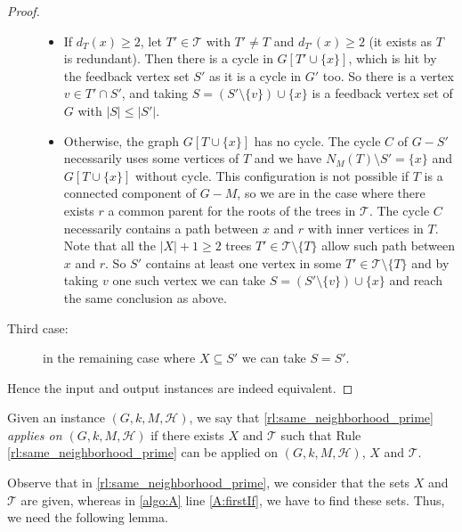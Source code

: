 \documentclass{amsart}
\newcommand{\T}{\mathcal{T}}
\newcommand{\mT}{\mathcal{T}}
\newcommand{\mH}{\mathcal{H}}
\newcommand{\ruleref}[1]{\hyperref[#1]{\ref*{#1}}}
\begin{document}
\begin{proof}
\begin{description}
\begin{itemize}
    \item If $d_{T}(x)\geq 2$, let $T'\in \T$ with $T'\neq T$ and $d_{T'}(x)\geq 2$ (it exists as $T$ is redundant). Then there is a cycle in $G[T'\cup \{x\}]$, which is hit by the feedback vertex set $S'$ as it is a cycle in $G'$ too. So there is a vertex $v\in T'\cap S'$, and taking $S=\left(S'\setminus \{v\}\right) \cup \{x\}$ is a feedback vertex set of $G$ with $|S|\leq |S'|$.

    \item Otherwise, the graph $G[T\cup \{ x \}]$ has no cycle. The cycle $C$ of $G-S'$ necessarily uses some vertices of $T$ and we have $N_M(T)\setminus S'=\{x\}$ and $G[T\cup \{ x \}]$ without cycle. This configuration is not possible if $T$ is a connected component of $G-M$, so we are in the case where there exists $r$ a common parent for the roots of the trees in $\T$. The cycle $C$ necessarily contains a path between $x$ and $r$ with inner vertices in $T$. Note that all the $|X|+1\ge 2$ trees $T'\in \T\setminus \{T\}$ allow such path between $x$ and $r$. So $S'$ contains at least one vertex in some $T'\in \T\setminus \{T\}$ and by taking $v$ one such vertex we can take $S=(S'\setminus \{v\})\cup \{x\}$ and reach the same conclusion as above.
\end{itemize}
\item[Third case:] in the remaining case where $X\subseteq S'$ we can take $S=S'$.
\end{description}
Hence the input and output instances are indeed equivalent.
\end{proof}


\begin{definition}
    Given an instance $(G,k, M, \mH)$, we say that  \ruleref{rl:same_neighborhood_prime} \emph{applies on $(G,k,M,\mH)$}
    if there exists $X$ and $\mT$ such that Rule \ruleref{rl:same_neighborhood_prime} can be applied on $(G,k,M,\mH)$, $X$ and $\mT$.
\end{definition}

Observe that in \ruleref{rl:same_neighborhood_prime}, we consider that the sets $X$ and $\mT$ are given, whereas in \autoref{algo:A} line \ref{A:firstIf}, we have to find these sets. Thus, we need the following lemma.
\end{document}
